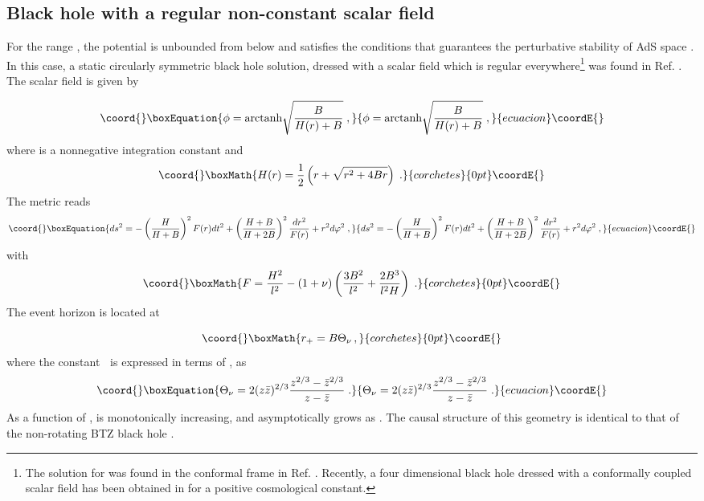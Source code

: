 \documentclass[a4paper,12pt]{article}
\begin{document}
\subsection{Black hole with a regular non-constant scalar field}

For the range \coordHE{}, the potential is unbounded from below and satisfies
the conditions that guarantees the perturbative stability of AdS space \cite
{M-T}. In this case, a static circularly symmetric black hole solution,
dressed with a scalar field which is regular everywhere\footnote{%
The solution for \coordHE{} was found in the conformal frame in Ref. \cite
{Martinez:1996gn}. Recently, a four dimensional black hole dressed with a
conformally coupled scalar field has been obtained in \cite{Martinez:2002ru}
for a positive cosmological constant.} was found in Ref. \cite{HMTZ}. The
scalar field is given by

\begin{equation}\coord{}\boxEquation{
\phi =\textrm{arctanh}\sqrt{\frac{B}{H(r)+B}}\;,  \label{Scalar}
}{
\phi =\textrm{arctanh}\sqrt{\frac{B}{H(r)+B}}\;,  }{ecuacion}\coordE{}\end{equation}
where \coordHE{} is a nonnegative integration constant and 
\[\coord{}\boxMath{
H(r)=\frac{1}{2}\left( r+\sqrt{r^{2}+4Br}\right) \;.
}{corchetes}{0pt}\coordE{}\]
The metric reads 
\begin{equation}\coord{}\boxEquation{
ds^{2}=-\left( \frac{H}{H+B}\right) ^{2}F(r)dt^{2}+\left( \frac{H+B}{H+2B}
\right) ^{2}\frac{dr^{2}}{F(r)}+r^{2}d\varphi ^{2}\;,  \label{The metric}
}{
ds^{2}=-\left( \frac{H}{H+B}\right) ^{2}F(r)dt^{2}+\left( \frac{H+B}{H+2B}
\right) ^{2}\frac{dr^{2}}{F(r)}+r^{2}d\varphi ^{2}\;,  }{ecuacion}\coordE{}\end{equation}
with 
\[\coord{}\boxMath{
F=\frac{H^{2}}{l^{2}}-(1+\nu )\left( \frac{3B^{2}}{l^{2}}+\frac{2B^{3}}{%
l^{2}H}\right) \;.
}{corchetes}{0pt}\coordE{}\]
The event horizon is located at

\[\coord{}\boxMath{
r_{+}=B\Theta _{\nu }\,, 
}{corchetes}{0pt}\coordE{}\]
where the constant \myHighlight{$\Theta _{\nu }$}\coordHE{}\textbf{\ }is expressed in terms of \coordHE{}, as 
\begin{equation}\coord{}\boxEquation{
\Theta _{\nu }=2(z\bar{z})^{2/3}\frac{z^{2/3}-\bar{z}^{2/3}}{z-\bar{z}}\;.
\label{Schuster}
}{
\Theta _{\nu }=2(z\bar{z})^{2/3}\frac{z^{2/3}-\bar{z}^{2/3}}{z-\bar{z}}\;.
}{ecuacion}\coordE{}\end{equation}
As a function of \myHighlight{$\nu $}\coordHE{}, \myHighlight{$\Theta _{\nu }$}\coordHE{} is monotonically increasing, and
asymptotically grows as \myHighlight{$\sqrt{\nu }$}\coordHE{}. The causal structure of this geometry
is identical to that of the non-rotating BTZ black hole \cite{BTZ}.
\end{document}
